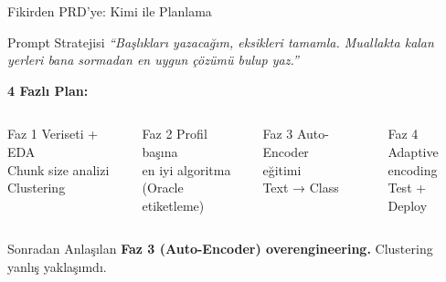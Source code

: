 \documentclass[10pt,aspectratio=43]{beamer}
\begin{document}
\begin{frame}{Fikirden PRD'ye: Kimi ile Planlama}
  \begin{exampleblock}{Prompt Stratejisi}
    \textit{``Başlıkları yazacağım, eksikleri tamamla. Muallakta kalan yerleri bana sormadan en uygun çözümü bulup yaz.''}
  \end{exampleblock}

  \vspace{0.3em}
  \textbf{4 Fazlı Plan:}
  \vspace{0.3em}
  \begin{columns}[T]
    \begin{block}{Faz 1}
      \centering
      \scriptsize Veriseti + EDA \\
      Chunk size analizi \\
      Clustering
    \end{block}
    \begin{block}{Faz 2}
      \centering
      \scriptsize Profil başına \\
      en iyi algoritma \\
      (Oracle etiketleme)
    \end{block}
    \begin{block}{Faz 3}
      \centering
      \scriptsize Auto-Encoder \\
      eğitimi \\
      Text → Class
    \end{block}
    \begin{block}{Faz 4}
      \centering
      \scriptsize Adaptive \\
      encoding \\
      Test + Deploy
    \end{block}
  \end{columns}

  \vspace{0.5em}
  \begin{alertblock}{Sonradan Anlaşılan}
    \textbf{Faz 3 (Auto-Encoder) overengineering.} Clustering yanlış yaklaşımdı.
  \end{alertblock}
\end{frame}
\end{document}
